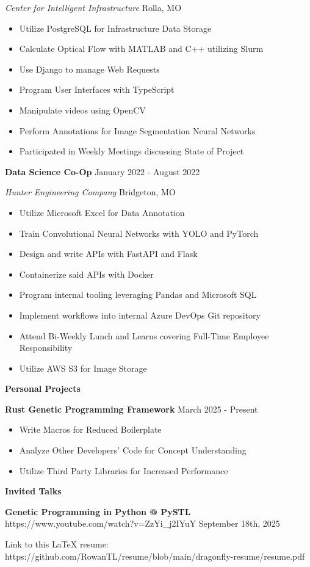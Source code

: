 \documentclass[11pt]{article}
\begin{document}
\textsl{Center for Intelligent Infrastructure} \hfill Rolla, MO
\begin{itemize}[noitemsep]
    \item Utilize PostgreSQL for Infrastructure Data Storage
    \item Calculate Optical Flow with MATLAB and C++ utilizing Slurm
    \item Use Django to manage Web Requests
    \item Program User Interfaces with TypeScript
    \item Manipulate videos using OpenCV
    \item Perform Annotations for Image Segmentation Neural Networks
    \item Participated in Weekly Meetings discussing State of Project
\end{itemize}

\textbf{Data Science Co-Op} \hfill January 2022 - August 2022

\textsl{Hunter Engineering Company} \hfill Bridgeton, MO
\begin{itemize}[noitemsep]
    \item Utilize Microsoft Excel for Data Annotation
    \item Train Convolutional Neural Networks with YOLO and PyTorch
    \item Design and write APIs with FastAPI and Flask
    \item Containerize said APIs with Docker
    \item Program internal tooling leveraging Pandas and Microsoft SQL
    \item Implement workflows into internal Azure DevOps Git repository
    \item Attend Bi-Weekly Lunch and Learns covering Full-Time Employee Responsibility
    \item Utilize AWS S3 for Image Storage
\end{itemize}

\begin{center}
    \textbf{Personal Projects}
\end{center}

\textbf{Rust Genetic Programming Framework} \hfill March 2025 - Present
\begin{itemize}[noitemsep]
    \item Write Macros for Reduced Boilerplate
    \item Analyze Other Developers' Code for Concept Understanding
    \item Utilize Third Party Libraries for Increased Performance
\end{itemize}

\begin{center}
    \textbf{Invited Talks}
\end{center}

\textbf{Genetic Programming in Python @ PySTL} \tiny{https://www.youtube.com/watch?v=ZzYi\_j2IYuY} \hfill September 18th, 2025

\begin{center}
    \tiny{Link to this LaTeX resume: https://github.com/RowanTL/resume/blob/main/dragonfly-resume/resume.pdf}
\end{center}
\end{document}

